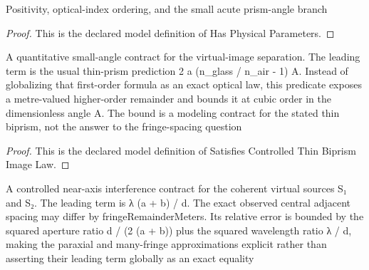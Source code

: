 \begin{definition}
  \label{def:physics:phyx-mini-0121:phyxminiproblems-problemphyxmini0121-hasphysicalparameters}
  Positivity, optical-index ordering, and the small acute prism-angle branch
\end{definition}
\begin{proof}
  This is the declared model definition of Has Physical Parameters.
\end{proof}
\begin{definition}
  \label{def:physics:phyx-mini-0121:phyxminiproblems-problemphyxmini0121-satisfiescontrolledthinbiprismimagelaw}
  A quantitative small-angle contract for the virtual-image separation. The leading term is the usual thin-prism prediction 2 a (n\_glass / n\_air - 1) A. Instead of globalizing that first-order formula as an exact optical law, this predicate exposes a metre-valued higher-order remainder and bounds it at cubic order in the dimensionless angle A. The bound is a modeling contract for the stated thin biprism, not the answer to the fringe-spacing question
\end{definition}
\begin{proof}
  This is the declared model definition of Satisfies Controlled Thin Biprism Image Law.
\end{proof}
\begin{definition}
  \label{def:physics:phyx-mini-0121:phyxminiproblems-problemphyxmini0121-satisfiescontrolledadjacentfringelaw}
  A controlled near-axis interference contract for the coherent virtual sources S₁ and S₂. The leading term is λ (a + b) / d. The exact observed central adjacent spacing may differ by fringeRemainderMeters. Its relative error is bounded by the squared aperture ratio d / (2 (a + b)) plus the squared wavelength ratio λ / d, making the paraxial and many-fringe approximations explicit rather than asserting their leading term globally as an exact equality
\end{definition}
